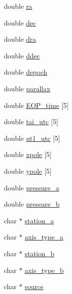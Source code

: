 \begin{DoxyCompactItemize}
\item 
double \hyperlink{structget_c_a_l_c__arg_a406c17384ed574e7edf926ff81b6177b}{ra}
\item 
double \hyperlink{structget_c_a_l_c__arg_a69a36739f5ab5a4ab66ed654d8bc4650}{dec}
\item 
double \hyperlink{structget_c_a_l_c__arg_a90ced3de8d8a66c10d771aee7af0fb3a}{dra}
\item 
double \hyperlink{structget_c_a_l_c__arg_a11a8cb8136e16c3c5304e484d07ac5b2}{ddec}
\item 
double \hyperlink{structget_c_a_l_c__arg_ae1c4cfcf385508ddde37e2c15f96fe16}{depoch}
\item 
double \hyperlink{structget_c_a_l_c__arg_aff499f61d9c8c972d9ec2ea4eab5fced}{parallax}
\item 
double \hyperlink{structget_c_a_l_c__arg_adcbab6f6a4b0d43a17ff83b052270a85}{E\+O\+P\+\_\+time} \mbox{[}5\mbox{]}
\item 
double \hyperlink{structget_c_a_l_c__arg_add5a9d3192a33c3ce58d81f093af17b6}{tai\+\_\+utc} \mbox{[}5\mbox{]}
\item 
double \hyperlink{structget_c_a_l_c__arg_a498ae2bafc7f976b0a341d2c0affda1e}{ut1\+\_\+utc} \mbox{[}5\mbox{]}
\item 
double \hyperlink{structget_c_a_l_c__arg_adb298edd422527a6c28e32d39fa6551a}{xpole} \mbox{[}5\mbox{]}
\item 
double \hyperlink{structget_c_a_l_c__arg_a5e8dd899a38303a14ae1b311970cb255}{ypole} \mbox{[}5\mbox{]}
\item 
double \hyperlink{structget_c_a_l_c__arg_a04dbaa5581e1526c89d39201458dd8ba}{pressure\+\_\+a}
\item 
double \hyperlink{structget_c_a_l_c__arg_a62e1f625545995f2423601581867bcd2}{pressure\+\_\+b}
\item 
char $\ast$ \hyperlink{structget_c_a_l_c__arg_ab70251b92c492b032fb0071c6fc1fd2c}{station\+\_\+a}
\item 
char $\ast$ \hyperlink{structget_c_a_l_c__arg_a3bd71f4b8fd264bdfe27cd7b950870b1}{axis\+\_\+type\+\_\+a}
\item 
char $\ast$ \hyperlink{structget_c_a_l_c__arg_a2f9338a38efce8d3bf0f52e25b7e1d27}{station\+\_\+b}
\item 
char $\ast$ \hyperlink{structget_c_a_l_c__arg_a16d5ce7f604eef83b0e0dd5b1e833df7}{axis\+\_\+type\+\_\+b}
\item 
char $\ast$ \hyperlink{structget_c_a_l_c__arg_ab843028117e16b082c1b3ec9540b68c6}{source}
\end{DoxyCompactItemize}



